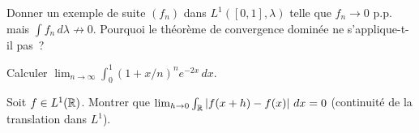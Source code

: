\begin{exercice}
Donner un exemple de suite $(f_n)$ dans $L^1([0,1], \lambda)$ telle que
$f_n \to 0$ p.p. mais $\int f_n\, d\lambda \not\to 0$. Pourquoi le th\'eor\`eme
de convergence domin\'ee ne s'applique-t-il pas~?
\end{exercice}

\begin{exercice}
Calculer $\lim_{n \to \infty} \int_0^1 (1 + x/n)^n e^{-2x}\, dx$.
\end{exercice}

\begin{exercice}
Soit $f \in L^1(\mathbb{R})$. Montrer que
$\lim_{h \to 0} \int_{\mathbb{R}} \left| f(x + h) - f(x) \right|\, dx = 0$
(continuit\'e de la translation dans $L^1$).
\end{exercice}
